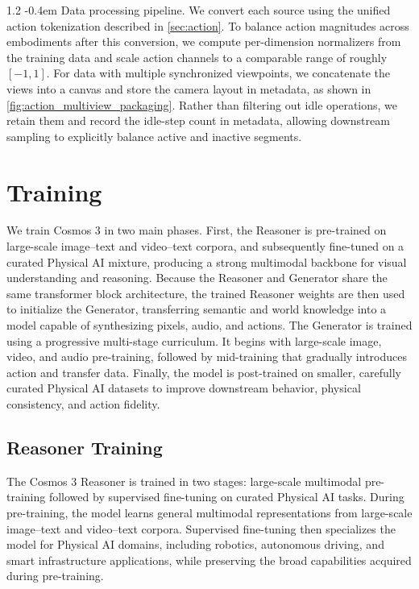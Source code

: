 \documentclass{llmxive}
\makeatletter
\providecommand{\paragraph}{  \@startsection{paragraph}{4}{\z@}    {1\baselineskip \@plus .2\baselineskip}    {-0.4em}    {\normalfont\normalsize\bfseries}}
\makeatother
\begin{document}
\paragraph{Data processing pipeline.}
We convert each source using the unified action tokenization described in \cref{sec:action}. To balance action magnitudes across embodiments after this conversion, we compute per-dimension normalizers from the training data and scale action channels to a comparable range of roughly $[-1,1]$. For data with multiple synchronized viewpoints, we concatenate the views into a canvas and store the camera layout in metadata, as shown in \cref{fig:action_multiview_packaging}. Rather than filtering out idle operations, we retain them and record the idle-step count in metadata, allowing downstream sampling to explicitly balance active and inactive segments.



\section{Training}
\label{sec::training}

We train Cosmos 3 in two main phases. First, the Reasoner is pre-trained on large-scale image--text and video--text corpora, and subsequently fine-tuned on a curated Physical AI mixture, producing a strong multimodal backbone for visual understanding and reasoning. Because the Reasoner and Generator share the same transformer block architecture, the trained Reasoner weights are then used to initialize the Generator, transferring semantic and world knowledge into a model capable of synthesizing pixels, audio, and actions. The Generator is trained using a progressive multi-stage curriculum. It begins with large-scale image, video, and audio pre-training, followed by mid-training that gradually introduces action and transfer data. Finally, the model is post-trained on smaller, carefully curated Physical AI datasets to improve downstream behavior, physical consistency, and action fidelity.


\subsection{Reasoner Training}

The Cosmos 3 Reasoner is trained in two stages: large-scale multimodal pre-training followed by supervised fine-tuning on curated Physical AI tasks. During pre-training, the model learns general multimodal representations from large-scale image--text and video--text corpora. Supervised fine-tuning then specializes the model for Physical AI domains, including robotics, autonomous driving, and smart infrastructure applications, while preserving the broad capabilities acquired during pre-training.
\end{document}
